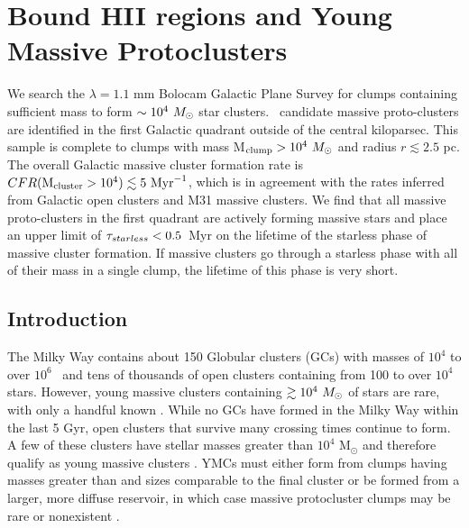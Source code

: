
%
\chapter{Bound HII regions and Young Massive Protoclusters}
\label{ch:ympc}


    
We search the $\lambda=1.1$ mm Bolocam Galactic Plane Survey for clumps
containing sufficient mass to form $\sim10^4~M_{\odot}$ star clusters.
\ncandidates\ candidate massive proto-clusters  are identified in the first Galactic quadrant outside
of the central kiloparsec.  This
sample is complete to clumps with mass M$_{\rm clump}>10^4~M_{\odot}$ and radius
$r\lesssim2.5$ pc.  The overall Galactic massive cluster formation rate is
$CFR({\rm M}_{\rm cluster}>10^4) \lesssim 5\  \mathrm{Myr}^{-1}$, which is in
agreement with the rates inferred from Galactic open clusters and M31 massive
clusters.  We find that all massive proto-clusters in the first quadrant are
actively forming massive stars and place an upper limit of
$\tau_{starless}<0.5$~Myr on the lifetime of the starless phase of massive
cluster formation.  If massive clusters go through a starless phase with all 
of their mass in a single clump, the lifetime of this phase is very short.

%



\section{Introduction}

The Milky Way contains about 150 Globular clusters (GCs) with masses of $10^4$
to over $10^6$ \msun\ and tens of thousands of open clusters containing from
100 to over $10^4$ stars.  However, young massive clusters containing
$\gtrsim10^4~M_{\odot}$ of stars are rare, with only a handful known
\citep{PortegiesZwart2010}. While no GCs have formed in the Milky Way within
the last 5 Gyr, open clusters that survive many crossing times continue to
form.   A few of these clusters have stellar masses greater than $10^4$
M$_{\odot}$ and therefore qualify as young massive clusters
\citep[YMCs;][]{PortegiesZwart2010}.   YMCs must either form from clumps having
masses greater than and sizes comparable to the final cluster  or be formed
from a larger, more diffuse reservoir, in which case massive protocluster
clumps may be rare or nonexistent  \citep{Kennicutt2012}.


